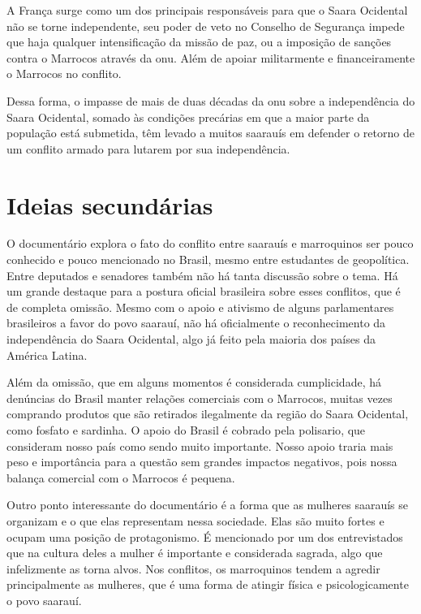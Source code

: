 	A França surge como um dos principais responsáveis para que o Saara Ocidental não se torne independente, seu poder de veto no Conselho de Segurança impede que haja qualquer intensificação da missão de paz, ou a imposição de sanções contra o Marrocos através da \gls{onu}. Além de apoiar militarmente e financeiramente o Marrocos no conflito.
	
	Dessa forma, o impasse de mais de duas décadas da \glsdesc{onu} sobre a independência do Saara Ocidental, somado às condições precárias em que a maior parte da população está submetida, têm levado a muitos saarauís em defender o retorno de um conflito armado para lutarem por sua independência. 
	
	\section{Ideias secundárias} \label{sec:ideias_outras}
	
	O documentário explora o fato do conflito entre saarauís e marroquinos ser pouco conhecido e pouco mencionado no Brasil, mesmo entre estudantes de geopolítica. Entre deputados e senadores também não há tanta discussão sobre o tema. Há um grande destaque para a postura oficial brasileira sobre esses conflitos, que é de completa omissão. Mesmo com o apoio e ativismo de alguns parlamentares brasileiros a favor do povo saarauí, não há oficialmente o reconhecimento da independência do Saara Ocidental, algo já feito pela maioria dos países da América Latina.
	
	Além da omissão, que em alguns momentos é considerada cumplicidade, há denúncias do Brasil manter relações comerciais com o Marrocos, muitas vezes comprando produtos que são retirados ilegalmente da região do Saara Ocidental, como fosfato e sardinha. O apoio do Brasil é cobrado pela \gls{polisario}, que consideram nosso país como sendo muito importante. Nosso apoio traria mais peso e importância para a questão sem grandes impactos negativos, pois nossa balança comercial com o Marrocos é pequena.
	
	Outro ponto interessante do documentário é a forma que as mulheres saarauís se organizam e o que elas representam nessa sociedade. Elas são muito fortes e ocupam uma posição de protagonismo. É mencionado por um dos entrevistados que na cultura deles a mulher é importante e considerada sagrada, algo que infelizmente as torna alvos. Nos conflitos, os marroquinos tendem a agredir principalmente as mulheres, que é uma forma de atingir física e psicologicamente o povo saarauí.
	
